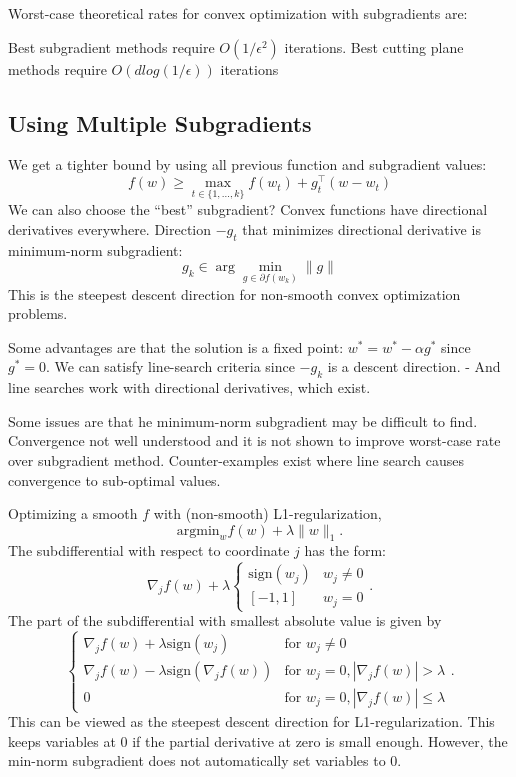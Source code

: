 \documentclass[
]{article}
\begin{document}
Worst-case theoretical rates for convex optimization with subgradients are:

Best subgradient methods require \(O(1/\epsilon^2)\) iterations.
Best cutting plane methods require \(O(d log(1/\epsilon))\) iterations

\subsection{Using Multiple Subgradients}\label{using-multiple-subgradients}

We get a tighter bound by using all previous function and subgradient values:
\[
f(w) \geq \max_{t \in \{1, \ldots, k\}} f(w_t) + g_t^\top (w - w_t)
\]
We can also choose the ``best'' subgradient?
Convex functions have directional derivatives everywhere. Direction \(-g_t\) that minimizes directional derivative is minimum-norm subgradient:
\[
g_k \in \arg\min_{g \in \partial f(w_k)} \|g\|
\]
This is the steepest descent direction for non-smooth convex optimization problems.

Some advantages are that the solution is a fixed point: \(w^* = w^* - \alpha g^*\) since \(g^* = 0\). We can satisfy line-search criteria since \(-g_k\) is a descent direction.
- And line searches work with directional derivatives, which exist.

Some issues are that he minimum-norm subgradient may be difficult to find. Convergence not well understood and it is not shown to improve worst-case rate over subgradient method. Counter-examples exist where line search causes convergence to sub-optimal values.

Optimizing a smooth \(f\) with (non-smooth) L1-regularization,
\[
\text{argmin}_w f(w) + \lambda \|w\|_1.
\]
The subdifferential with respect to coordinate \(j\) has the form:
\[
\nabla_j f(w) + \lambda \begin{cases}
\text{sign}(w_j) & w_j \neq 0 \\
[-1, 1] & w_j = 0
\end{cases}.
\]
The part of the subdifferential with smallest absolute value is given by
\[
\begin{cases}
\nabla_j f(w) + \lambda \text{sign}(w_j) & \text{for } w_j \neq 0 \\
\nabla_j f(w) - \lambda \text{sign}(\nabla_j f(w)) & \text{for } w_j = 0, |\nabla_j f(w)| > \lambda \\
0 & \text{for } w_j = 0, |\nabla_j f(w)| \leq \lambda
\end{cases}.
\]
This can be viewed as the steepest descent direction for L1-regularization. This keeps variables at 0 if the partial derivative at zero is small enough. However, the min-norm subgradient does not automatically set variables to 0.
\end{document}
